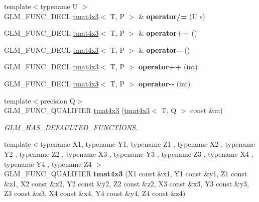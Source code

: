 \begin{DoxyCompactItemize}
\item 
\mbox{\label{structglm_1_1tmat4x3_a42098fc1e415bf49d41c274f7de91670}} 
{\footnotesize template$<$typename U $>$ }\\G\+L\+M\+\_\+\+F\+U\+N\+C\+\_\+\+D\+E\+CL \hyperlink{structglm_1_1tmat4x3}{tmat4x3}$<$ T, P $>$ \& {\bfseries operator/=} (U s)
\item 
\mbox{\label{structglm_1_1tmat4x3_af4b18332c7f704b49e7ac15174317398}} 
G\+L\+M\+\_\+\+F\+U\+N\+C\+\_\+\+D\+E\+CL \hyperlink{structglm_1_1tmat4x3}{tmat4x3}$<$ T, P $>$ \& {\bfseries operator++} ()
\item 
\mbox{\label{structglm_1_1tmat4x3_ae461258920b150f2cb362db59614ac4a}} 
G\+L\+M\+\_\+\+F\+U\+N\+C\+\_\+\+D\+E\+CL \hyperlink{structglm_1_1tmat4x3}{tmat4x3}$<$ T, P $>$ \& {\bfseries operator-\/-\/} ()
\item 
\mbox{\label{structglm_1_1tmat4x3_aced7018440bc939db70acd9c9e926f4c}} 
G\+L\+M\+\_\+\+F\+U\+N\+C\+\_\+\+D\+E\+CL \hyperlink{structglm_1_1tmat4x3}{tmat4x3}$<$ T, P $>$ {\bfseries operator++} (int)
\item 
\mbox{\label{structglm_1_1tmat4x3_abcf46e2d3e6f419c177450b1dd5b7cd2}} 
G\+L\+M\+\_\+\+F\+U\+N\+C\+\_\+\+D\+E\+CL \hyperlink{structglm_1_1tmat4x3}{tmat4x3}$<$ T, P $>$ {\bfseries operator-\/-\/} (int)
\item 
\mbox{\label{structglm_1_1tmat4x3_a1624d09850df202d4eb177a4ae7819c5}} 
{\footnotesize template$<$precision Q$>$ }\\G\+L\+M\+\_\+\+F\+U\+N\+C\+\_\+\+Q\+U\+A\+L\+I\+F\+I\+ER \hyperlink{structglm_1_1tmat4x3_a1624d09850df202d4eb177a4ae7819c5}{tmat4x3} (\hyperlink{structglm_1_1tmat4x3}{tmat4x3}$<$ T, Q $>$ const \&m)
\begin{DoxyCompactList}\small\item\em G\+L\+M\+\_\+\+H\+A\+S\+\_\+\+D\+E\+F\+A\+U\+L\+T\+E\+D\+\_\+\+F\+U\+N\+C\+T\+I\+O\+NS. \end{DoxyCompactList}\item 
\mbox{\label{structglm_1_1tmat4x3_a345c6365fa065203321bbda257bca54a}} 
{\footnotesize template$<$typename X1, typename Y1, typename Z1 , typename X2 , typename Y2 , typename Z2 , typename X3 , typename Y3 , typename Z3 , typename X4 , typename Y4 , typename Z4 $>$ }\\G\+L\+M\+\_\+\+F\+U\+N\+C\+\_\+\+Q\+U\+A\+L\+I\+F\+I\+ER {\bfseries tmat4x3} (X1 const \&x1, Y1 const \&y1, Z1 const \&z1, X2 const \&x2, Y2 const \&y2, Z2 const \&z2, X3 const \&x3, Y3 const \&y3, Z3 const \&z3, X4 const \&x4, Y4 const \&y4, Z4 const \&z4)

\end{DoxyCompactItemize}
